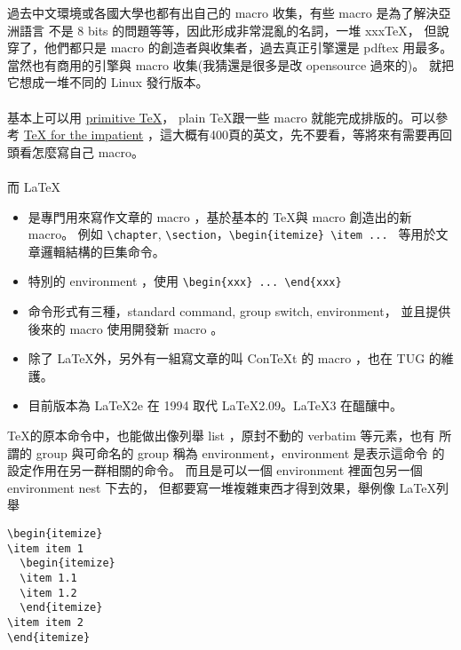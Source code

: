 過去中文環境或各國大學也都有出自己的 macro 收集，有些 macro 是為了解決亞洲語言
不是 8 bits 的問題等等，因此形成非常混亂的名詞，一堆 xxxTeX，
但說穿了，他們都只是 macro 的創造者與收集者，過去真正引擎還是 pdftex 用最多。
當然也有商用的引擎與 macro 收集(我猜還是很多是改 opensource 過來的)。
就把它想成一堆不同的 Linux 發行版本。
\\\\
基本上可以用 
\href{https://en.wikibooks.org/wiki/TeX}{primitive \TeX}，
plain \TeX 跟一些 macro 就能完成排版的。可以參考
\href{https://ctan.math.utah.edu/ctan/tex-archive/info/impatient/book.pdf}{{\TeX} for the impatient}
，這大概有400頁的英文，先不要看，等將來有需要再回頭看怎麼寫自己 macro。
\\\\
而 \LaTeX
\begin{itemize}
\item 是專門用來寫作文章的 macro ，基於基本的 \TeX 與 macro 創造出的新 macro。
 例如 \verb=\chapter=, \verb=\section=，\verb=\begin{itemize} \item ... = 
 等用於文章邏輯結構的巨集命令。
\item 特別的 environment ，使用 \verb=\begin{xxx} ... \end{xxx}=
\item 命令形式有三種，standard command, group switch, environment，
並且提供後來的 macro 使用開發新 macro 。
\item 除了 \LaTeX 外，另外有一組寫文章的叫 ConTeXt 的 macro ，也在 TUG 的維護。
\item 目前版本為 \LaTeX 2e 在 1994 取代 \LaTeX 2.09。\LaTeX 3 在醞釀中。
\end{itemize}
\TeX 的原本命令中，也能做出像列舉 list ，原封不動的 verbatim 等元素，也有
所謂的 group 與可命名的 group 稱為 environment，environment 是表示這命令
的設定作用在另一群相關的命令。 而且是可以一個 environment 裡面包另一個 
environment nest 下去的， 但都要寫一堆複雜東西才得到效果，舉例像 \LaTeX 列舉
\begin{verbatim}
\begin{itemize}
\item item 1
  \begin{itemize}
  \item 1.1
  \item 1.2
  \end{itemize}
\item item 2
\end{itemize}
\end{verbatim}
